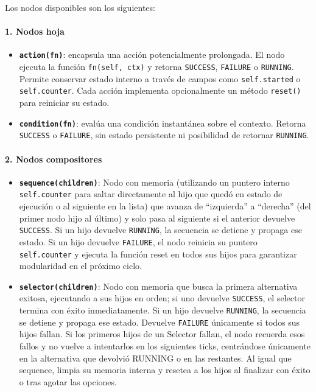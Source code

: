 \documentclass{prgrado}
\begin{document}
Los nodos disponibles son los siguientes:

\paragraph{1. Nodos hoja}

\begin{itemize}
    \item \textbf{\texttt{action(fn)}}: encapsula una acción potencialmente prolongada. El nodo ejecuta la función \texttt{fn(self, ctx)} y retorna \texttt{SUCCESS}, \texttt{FAILURE} o \texttt{RUNNING}. Permite conservar estado interno a través de campos como \texttt{self.started} o \texttt{self.counter}. Cada acción implementa opcionalmente un método \texttt{reset()} para reiniciar su estado.
   
    \item \textbf{\texttt{condition(fn)}}: evalúa una condición instantánea sobre el contexto. Retorna \texttt{SUCCESS} o \texttt{FAILURE}, sin estado persistente ni posibilidad de retornar \texttt{RUNNING}.
\end{itemize}

\paragraph{2. Nodos compositores}

\begin{itemize}
    \item \textbf{\texttt{sequence(children)}}: Nodo con memoria (utilizando un puntero interno \texttt{self.counter} para saltar directamente al hijo que quedó en estado de ejecución o al siguiente en la lista) que avanza de ``izquierda'' a ``derecha'' (del primer nodo hijo al último) y solo pasa al siguiente si el anterior devuelve \texttt{SUCCESS}. Si un hijo devuelve \texttt{RUNNING}, la secuencia se detiene y propaga ese estado. Si un hijo devuelve \texttt{FAILURE}, el nodo reinicia su puntero \texttt{self.counter} y ejecuta la función reset en todos sus hijos para garantizar modularidad en el próximo ciclo.
   
    \item \textbf{\texttt{selector(children)}}: Nodo con memoria que busca la primera alternativa exitosa, ejecutando a sus hijos en orden; si uno devuelve \texttt{SUCCESS}, el selector termina con éxito inmediatamente. Si un hijo devuelve \texttt{RUNNING}, la secuencia se detiene y propaga ese estado. Devuelve \texttt{FAILURE} únicamente si todos sus hijos fallan. Si los primeros hijos de un Selector fallan, el nodo recuerda esos fallos y no vuelve a intentarlos en los siguientes ticks, centrándose únicamente en la alternativa que devolvió RUNNING o en las restantes. Al igual que sequence, limpia su memoria interna y resetea a los hijos al finalizar con éxito o tras agotar las opciones.
\end{itemize}
\end{document}
